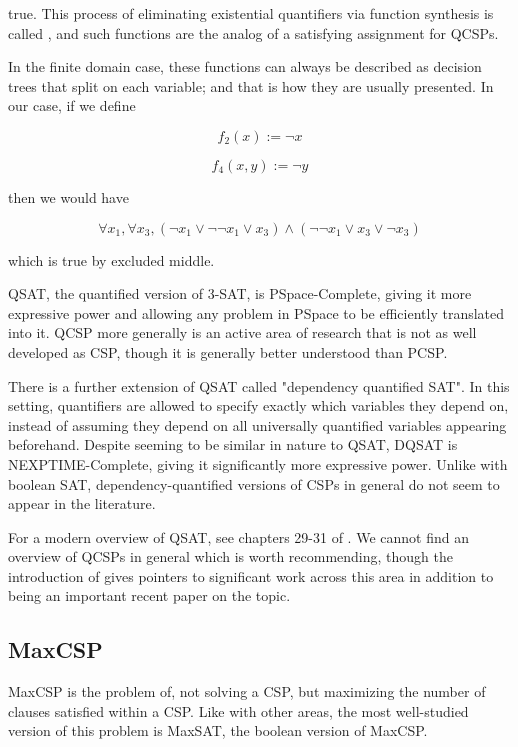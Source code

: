 true. This process of eliminating existential quantifiers via function synthesis is called , and such functions are the analog of a satisfying assignment for QCSPs.

In the finite domain case, these functions can always be described as decision trees that split on each variable; and that is how they are usually presented. In our case, if we define

\begin{equation}
    f_2(x) := \neg x
\end{equation}

\begin{equation}
    f_4(x, y) := \neg y
\end{equation}

then we would have

\begin{equation}
    \forall x_1, \forall x_3, (\neg x_1 \vee \neg \neg x_1 \vee x_3) \wedge (\neg \neg x_1 \vee x_3 \vee \neg x_3)
\end{equation}

which is true by excluded middle.

QSAT, the quantified version of 3-SAT, is PSpace-Complete, giving it more expressive power and allowing any problem in PSpace to be efficiently translated into it. QCSP more generally is an active area of research that is not as well developed as CSP, though it is generally better understood than PCSP.

There is a further extension of QSAT called "dependency quantified SAT". In this setting, quantifiers are allowed to specify exactly which variables they depend on, instead of assuming they depend on all universally quantified variables appearing beforehand. Despite seeming to be similar in nature to QSAT, DQSAT is NEXPTIME-Complete, giving it significantly more expressive power. Unlike with boolean SAT, dependency-quantified versions of CSPs in general do not seem to appear in the literature.

For a modern overview of QSAT, see chapters 29-31 of \citep{biere2009handbook}. We cannot find an overview of QCSPs in general which is worth recommending, though the introduction of \citep{zhuk2023complete} gives pointers to significant work across this area in addition to being an important recent paper on the topic.


\subsection{MaxCSP}\label{sec:max-csp}
MaxCSP is the problem of, not solving a CSP, but maximizing the number of clauses satisfied within a CSP. Like with other areas, the most well-studied version of this problem is MaxSAT, the boolean version of MaxCSP.

